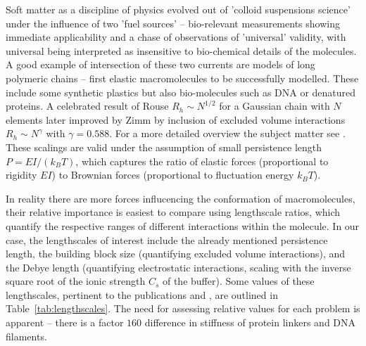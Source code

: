 \documentclass{doctoral}
\begin{document}
Soft matter as a discipline of physics evolved out of 'colloid suspensions science' under the influence of two 'fuel sources' -- bio-relevant measurements showing immediate applicability and a chase of observations of 'universal' validity, with universal being interpreted as insensitive to bio-chemical details of the molecules.
A good example of intersection of these two currents are models of long polymeric chains -- first elastic macromolecules to be successfully modelled.
These include some synthetic plastics but also bio-molecules such as DNA or denatured proteins.
A celebrated result of Rouse $R_h \sim N^{1/2}$ for a Gaussian chain with $N$ elements \cite{Rouse_1953} later improved by Zimm by inclusion of excluded volume interactions \cite{Zimm_1956} $R_h \sim N^\gamma$ with $\gamma=0.588$.
For a more detailed overview the subject matter see \textcite[chapter 3]{Dhont_2008}.
These scalings are valid under the assumption of small persistence length $P = EI / (k_B T)$, which captures the ratio of elastic forces (proportional to rigidity $EI$) to Brownian forces (proportional to fluctuation energy $k_B T$).

In reality there are more forces influcencing the conformation of macromolecules, their relative importance is easiest to compare using lengthscale ratios, which quantify the respective ranges of different interactions within the molecule.
In our case, the lengthscales of interest include the already mentioned persistence length, the building block size (quantifying excluded volume interactions), and the Debye length (quantifying electrostatic interactions, scaling with the inverse square root of the ionic strength $C_s$ of the buffer).
Some values of these lengthscales, pertinent to the publications \cite{Waszkiewicz_2023_dna} and \cite{Waszkiewicz_2024_mda}, are outlined in Table~\ref{tab:lengthscales}.
The need for assessing relative values for each problem is apparent -- there is a factor $160$ difference in stiffness of protein linkers and DNA filaments.
\end{document}

